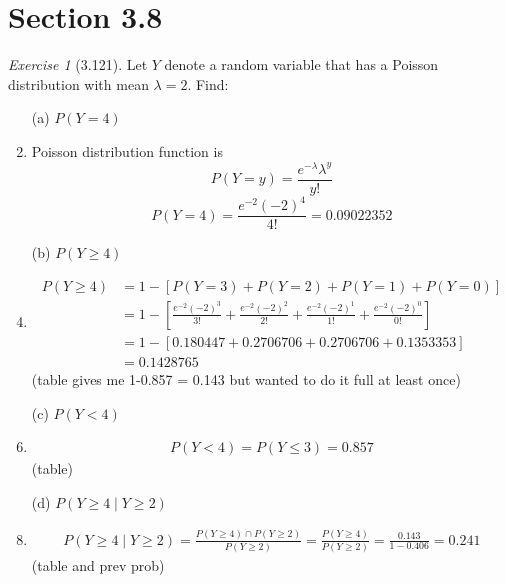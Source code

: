 \documentclass[12pt]{amsart}
\makeatletter
\theoremstyle{remark}
\newtheorem*{exercise}{Exercise}%
\renewenvironment{proof}[1][\proofname]{\par\doublespacing
  \pushQED{\qed}%
  \normalfont \topsep6\p@\@plus6\p@\relax
  \list{}{%
    \settowidth{\leftmargin}{\itshape\proofname:\hskip\labelsep}%
    \setlength{\labelwidth}{0pt}%
    \setlength{\itemindent}{-\leftmargin}%
  }%
  \item[\hskip\labelsep\itshape#1\@addpunct{:}]\ignorespaces
}{%
  \popQED\endlist\@endpefalse
  \singlespacing
}
\theoremstyle{mycomment}
\makeatother
\begin{document}
\thispagestyle{fancy}
\section*{Section 3.8} 



\begin{exercise}[3.121]Let $Y$ denote a random variable that has a Poisson distribution with mean $\lambda = 2$. Find:

\begin{enumerate}
    \item[(a)] $P(Y = 4)$
\begin{proof}[Solution]
	Poisson distribution function is $$P(Y=y)= \frac{e^{-\lambda} \lambda^y}{y!}$$
	$$P(Y=4) = \frac{e^{-2}(-2)^4}{4!} = 0.09022352$$
\end{proof}
    \item[(b)] $P(Y \geq 4)$
\begin{proof}[Solution]
	\begin{align*}
		P(Y \geq 4) &= 1 - [P(Y=3) + P(Y=2) + P(Y=1) + P(Y=0)] \\
			&= 1 - [\frac{e^{-2}(-2)^3}{3!} + \frac{e^{-2}(-2)^2}{2!} + \frac{e^{-2}(-2)^1}{1!} + \frac{e^{-2}(-2)^0}{0!}] \\
			&= 1 - [0.180447 + 0.2706706 + 0.2706706 + 0.1353353] \\
			&= 0.1428765
	\end{align*} 
	(table gives me 1-0.857 = 0.143 but wanted to do it full at least once)
\end{proof}
    \item[(c)] $P(Y < 4)$
\begin{proof}[Solution]
	\begin{align*}
		P(Y < 4) = P(Y \leq 3) = 0.857
	\end{align*}
	(table)
\end{proof}
    \item[(d)] $P(Y \geq 4 \mid Y \geq 2)$
\begin{proof}[Solution]
	\begin{align*}
		P(Y \geq 4 \mid Y \geq 2) = \frac{ P(Y \geq 4) \cap P(Y \geq 2)}{P(Y \geq 2)} = \frac{P(Y \geq 4)}{P(Y \geq 2)} = \frac{0.143}{1-0.406} = 0.241
	\end{align*}
	(table and prev prob)
\end{proof}
\end{enumerate} 
\end{exercise}
\end{document}
